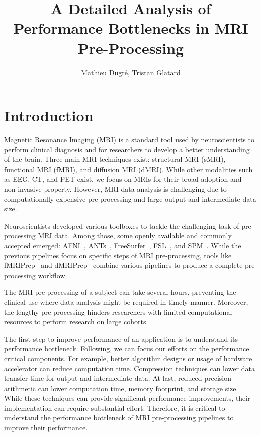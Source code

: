 \documentclass[conference]{IEEEtran}
\title{A Detailed Analysis of Performance Bottlenecks in MRI Pre-Processing}
\author{Mathieu Dugr\'e, Tristan Glatard}
\begin{document}
\maketitle

\begin{abstract}
																																																																																																																																																																																												
\end{abstract}

\section{Introduction}
Magnetic Resonance Imaging (MRI) is a standard tool used by neuroscientists to perform clinical diagnosis and for researchers to develop a better understanding of the brain. Three main MRI techniques exist: structural MRI (sMRI), functional MRI (fMRI), and diffusion MRI (dMRI). While other modalities such as EEG, CT, and PET exist, we focus on MRIs for their broad adoption and non-invasive property. However, MRI data analysis is challenging due to computationally expensive pre-processing and large output and intermediate data size.

Neuroscientists developed various toolboxes to tackle the challenging task of pre-processing MRI data. Among those, some openly available and commonly accepted emerged: AFNI~\cite{Cox1996-sl}, ANTs~\cite{Avants_undated-fu}, FreeSurfer~\cite{Fischl2012-bp}, FSL~\cite{Jenkinson2012-cq}, and SPM~\cite{Friston2007-ag}. While the previous pipelines focus on specific steps of MRI pre-processing, tools like fMRIPrep~\cite{Esteban2019-og} and dMRIPrep~\cite{Michael2021-4515513} combine various pipelines to produce a complete pre-processing workflow.

The MRI pre-processing of a subject can take several hours, preventing the clinical use where data analysis might be required in timely manner. Moreover, the lengthy pre-processing hinders researchers with limited computational resources to perform research on large cohorts.

The first step to improve performance of an application is to understand its performance bottleneck. Following, we can focus our efforts on the performance critical components. For example, better algorithm designs or usage of hardware accelerator can reduce computation time. Compression techniques can lower data transfer time for output and intermediate data. At last, reduced precision arithmetic can lower computation time, memory footprint, and storage size. While these techniques can provide significant performance improvements, their implementation can require substantial effort. Therefore, it is critical to understand the performance bottleneck of MRI pre-processing pipelines to improve their performance.
\end{document}
